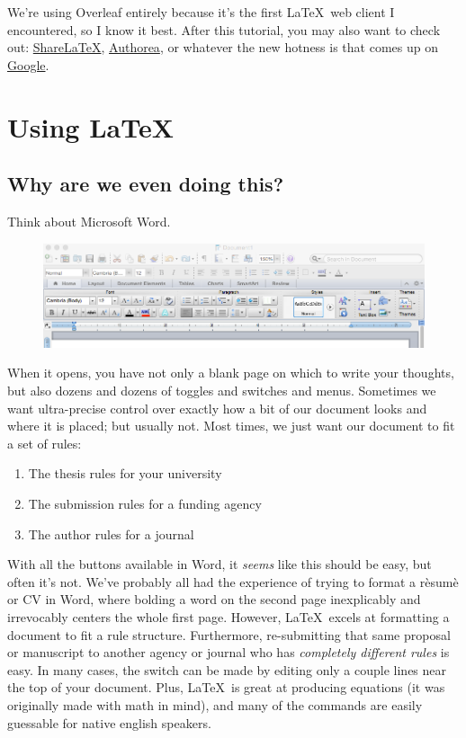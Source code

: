 \documentclass[12pt]{article}
\begin{document}
We're using Overleaf entirely because it's the first \LaTeX ~web client I encountered, so I know it best. After this tutorial, you may also want to check out: \href{https://www.sharelatex.com}{ShareLaTeX}, \href{https://www.authorea.com/}{Authorea}, or whatever the new hotness is that comes up on \href{http://www.google.com/search?q=collaborative+latex+editor}{Google}.

\section{Using \LaTeX}

\subsection{Why are we even doing this?}

Think about Microsoft Word. 
\begin{figure}[H]
\includegraphics[width=\textwidth]{Images/word.png}
\end{figure}
When it opens, you have not only a blank page on which to write your thoughts, but also dozens and dozens of toggles and switches and menus. Sometimes we want ultra-precise control over exactly how a bit of our document looks and where it is placed; but usually not. Most times, we just want our document to fit a set of rules:
\begin{enumerate}
\item The thesis rules for your university
\item The submission rules for a funding agency
\item The author rules for a journal
\end{enumerate}

With all the buttons available in Word, it \textit{seems} like this should be easy, but often it's not. We've probably all had the experience of trying to format a rèsumè or CV in Word, where bolding a word on the second page inexplicably and irrevocably centers the whole first page. However, \LaTeX ~excels at formatting a document to fit a rule structure. Furthermore, re-submitting that same proposal or manuscript to another agency or journal who has \textit{completely different rules} is easy. In many cases, the switch can be made by editing only a couple lines near the top of your document. Plus, \LaTeX ~is great at producing equations (it was originally made with math in mind), and many of the commands are easily guessable for native english speakers.
\end{document}
